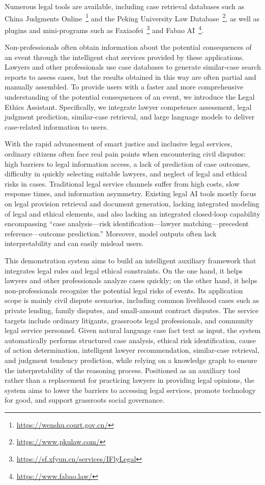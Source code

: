 \documentclass[conference]{IEEEtran}
\begin{document}
Numerous legal tools are available, including case retrieval databases such as China Judgments Online~\footnote{\url{https://wenshu.court.gov.cn/}} and the Peking University Law Database~\footnote{\url{https://www.pkulaw.com/}}, as well as plugins and mini-programs such as Faxiaofei~\footnote{\url{https://sf.xfyun.cn/services/IFlyLegal}} and Fabao AI~\footnote{\url{https://www.fabao.law/}}.

Non-professionals often obtain information about the potential consequences of an event through the intelligent chat services provided by these applications. Lawyers and other professionals use case databases to generate similar-case search reports to assess cases, but the results obtained in this way are often partial and manually assembled. To provide users with a faster and more comprehensive understanding of the potential consequences of an event, we introduce the Legal Ethics Assistant. Specifically, we integrate lawyer competence assessment, legal judgment prediction, similar-case retrieval, and large language models to deliver case-related information to users.

With the rapid advancement of smart justice and inclusive legal services, ordinary citizens often face real pain points when encountering civil disputes: high barriers to legal information access, a lack of prediction of case outcomes, difficulty in quickly selecting suitable lawyers, and neglect of legal and ethical risks in cases. Traditional legal service channels suffer from high costs, slow response times, and information asymmetry. Existing legal AI tools mostly focus on legal provision retrieval and document generation, lacking integrated modeling of legal and ethical elements, and also lacking an integrated closed-loop capability encompassing ``case analysis---risk identification---lawyer matching---precedent reference---outcome prediction.'' Moreover, model outputs often lack interpretability and can easily mislead users.

This demonstration system aims to build an intelligent auxiliary framework that integrates legal rules and legal ethical constraints. On the one hand, it helps lawyers and other professionals analyze cases quickly; on the other hand, it helps non-professionals recognize the potential legal risks of events. Its application scope is mainly civil dispute scenarios, including common livelihood cases such as private lending, family disputes, and small-amount contract disputes. The service targets include ordinary litigants, grassroots legal professionals, and community legal service personnel. Given natural language case fact text as input, the system automatically performs structured case analysis, ethical risk identification, cause of action determination, intelligent lawyer recommendation, similar-case retrieval, and judgment tendency prediction, while relying on a knowledge graph to ensure the interpretability of the reasoning process. Positioned as an auxiliary tool rather than a replacement for practicing lawyers in providing legal opinions, the system aims to lower the barriers to accessing legal services, promote technology for good, and support grassroots social governance.
\end{document}
